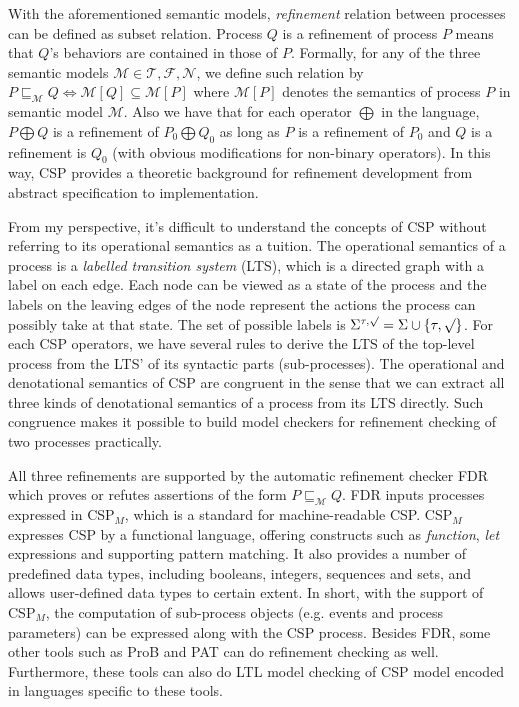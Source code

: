 \documentclass{llncs}
\newcommand{\csptick}{\surd}
\newcommand{\csptau}{\tau}
\newcommand{\csptracesmodel}{\mathcal{T}}
\newcommand{\cspfdrmodel}{\mathcal{N}}
\newcommand{\cspfailuresmodel}{\mathcal{F}}
\newcommand{\cspm}{CSP$_M$}
\begin{document}
With the aforementioned semantic models, \emph{refinement} relation between
processes can be defined as subset relation. Process $Q$ is a
refinement of process $P$ means that $Q$'s behaviors are contained in those of
$P$. Formally, for any of the three semantic models $\mathcal{M} \in
{\csptracesmodel, \cspfailuresmodel, \cspfdrmodel}$, we define such relation by
$P \sqsubseteq_{\mathcal{M}} Q \iff \mathcal{M}[Q] \subseteq \mathcal{M}[P]$
where $\mathcal{M}[P]$ denotes the semantics of process $P$ in semantic model
$\mathcal{M}$. Also we have that for each operator $\bigoplus$ in the language,
$P \bigoplus Q$ is a refinement of $P_0 \bigoplus Q_0$ as long as $P$ is a
refinement of $P_0$ and $Q$ is a refinement is $Q_0$ (with obvious modifications
for non-binary operators). In this way, CSP provides a theoretic background
for refinement development from abstract specification to implementation.

From my perspective, it's difficult to understand the concepts of CSP
without referring to its operational semantics as a tuition.
The operational semantics of a process is a \emph{labelled transition system} (LTS), 
which is a directed graph with a label on each edge. Each node can be viewed as
a state of the process and the labels on the leaving edges of the node represent
the actions the process can possibly take at that state. The set of
possible labels is $\Sigma^{\csptau, \csptick} = \Sigma \cup \{\csptau, \csptick\}$. 
For each CSP operators, we have several rules to derive the LTS of the
top-level process from the LTS' of its syntactic parts (sub-processes). 
The operational and denotational semantics of CSP are congruent in the sense
that we can extract all three kinds of denotational semantics of a process from its
LTS directly. Such congruence makes it possible to build model checkers for
refinement checking of two processes practically.

All three refinements are supported by the automatic refinement checker FDR
which proves or refutes assertions of the form $P \sqsubseteq_{\mathcal{M}} Q$.
FDR inputs processes expressed in \cspm, which is a standard for
machine-readable CSP. \cspm{} expresses CSP by a functional language, offering
constructs such as \emph{function}, \emph{let} expressions and supporting
pattern matching. It also provides a number of predefined data types, including
booleans, integers, sequences and sets, and allows user-defined data types to
certain extent. In short, with the support of \cspm, the computation of 
sub-process objects (e.g. events and process parameters) can be expressed along
with the CSP process.  Besides FDR, some other tools such as ProB and PAT can
do refinement checking as well. Furthermore, these tools can also do 
LTL model checking of CSP model encoded in languages specific to these tools.
\end{document}
